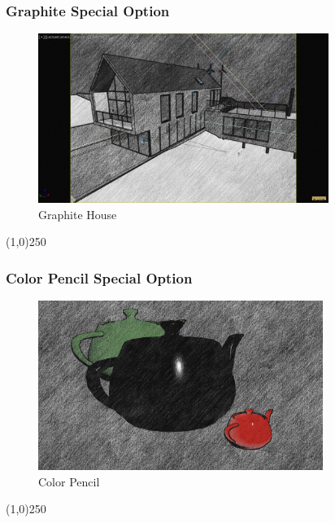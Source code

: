 \begin{frame}
\frametitle{Graphite Special Option}
\begin{figure}
	\centering
	\includegraphics[height=5.5cm]{img/ViewportOptions/GraphiteHouse.jpg}
	\caption{Graphite House}
	\label{fig:GraphiteHouseOption}
\end{figure}
\end{frame}
\begin{center}\line(1,0){250}\end{center}



\begin{frame}
\frametitle{Color Pencil Special Option}
\begin{figure}
	\centering
	\includegraphics[height=5.5cm]{img/ViewportOptions/ColorPencil.jpg}
	\caption{Color Pencil}
	\label{fig:ColorPencil}
\end{figure}
\end{frame}
\begin{center}\line(1,0){250}\end{center}




